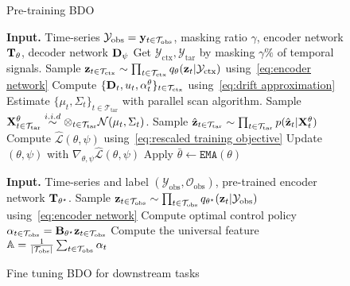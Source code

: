 \begin{figure}[!t]
\begin{minipage}[t]{0.51\textwidth}
\begin{algorithm}[H]
\caption{Pre-training BDO}
\begin{algorithmic}[1]
    \STATE \textbf{Input. } Time-series $\mathcal{Y}_{\text{obs}} = \mathbf{y}_{t \in \mathcal{T}_{\text{obs}}}$, masking ratio $\gamma$, encoder network $\mathbf{T}_{\theta}$, decoder network $\mathbf{D}_{\psi}$
        \STATE Get $\mathcal{Y}_{\text{ctx}}, \mathcal{Y}_{\text{tar}}$ by masking $\gamma \%$ of temporal signals.
        \STATE Sample $\mathbf{z}_{t \in \mathcal{T}_{\text{ctx}}} \sim \prod_{t \in \mathcal{T}_{\text{ctx}}} q_{\theta}(\mathbf{z}_t | \mathcal{Y}_{\text{ctx}})$ using~\eqref{eq:encoder network}
        \STATE Compute $\{\mathbf{D}_t, u_t, \alpha^{\theta}_t\}_{t \in \mathcal{T}_{\text{ctx}}}$ using~\eqref{eq:drift approximation}
        \STATE Estimate $\{\mu_t, \Sigma_t\}_{t \in \mathcal{T}_{\text{tar}}}$ with parallel scan algorithm.
        \STATE Sample $\mathbf{X}^{\theta}_{t \in \mathcal{T}_{\text{tar}}} \stackrel{i.i.d}{\sim} \otimes_{t \in \mathcal{T}_{\text{tar}}} \mathcal{N}(\mu_t, \Sigma_t)$.
        \STATE Sample $\hat{\mathbf{z}}_{t \in \mathcal{T}_{\text{tar}}} \sim \prod_{t \in \mathcal{T}_{\text{tar}}} p(\hat{\mathbf{z}}_t | \mathbf{X}^{\theta}_t)$
        \STATE Compute $\hat{\mathcal{L}}(\theta, \psi)$ using~\eqref{eq:rescaled training objective}
        \STATE Update $(\theta, \psi)$ with $\nabla_{\theta, \psi} \hat{\mathcal{L}}(\theta, \psi)$
        \STATE Apply $\bar{\theta} \leftarrow \texttt{EMA}(\theta)$
    \ENDFOR
\end{algorithmic}\label{algorithm:pretrain}
\end{algorithm}
\end{minipage}
\begin{minipage}[t]{0.47\textwidth}
\begin{algorithm}[H]
\caption{Fine tuning BDO for downstream tasks}
\begin{algorithmic}[1]
    \STATE \textbf{Input. } Time-series and label $(\mathcal{Y}_{\text{obs}}, \mathcal{O}_{\text{obs}})$, pre-trained encoder network $\mathbf{T}_{\theta^{\star}}$.
        \STATE Sample $\mathbf{z}_{t \in \mathcal{T}_{\text{obs}}} \sim \prod_{t \in \mathcal{T}_{\text{obs}}} q_{\theta^{\star}}(\mathbf{z}_t | \mathcal{Y}_{\text{obs}})$ 
        using~\eqref{eq:encoder network}
        \STATE Compute optimal control policy $\alpha_{t \in \mathcal{T}_{\text{obs}}} = \mathbf{B}_{\theta^{\star}} \mathbf{z}_{t \in \mathcal{T}_{\text{obs}}}$
        \STATE Compute the universal feature $\mathbb{A} = \frac{1}{|\mathcal{T}_{\text{obs}}|}\sum_{t \in \mathcal{T}_{\text{obs}}} \alpha_t$

\end{algorithmic}
\end{algorithm}
\end{minipage}
\end{figure}
